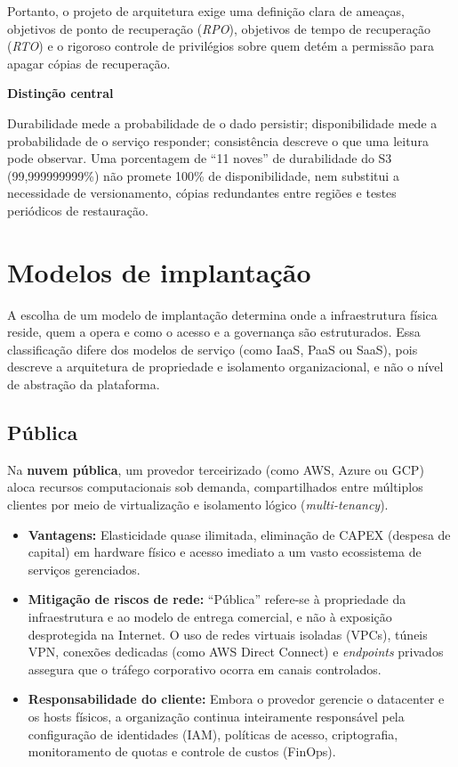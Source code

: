 \documentclass[11pt,a4paper]{article}
\newcommand{\destaque}[2]{\begin{center}\begin{minipage}{.96\textwidth}
  \colorbox{fundo}{\begin{minipage}{\dimexpr\linewidth-2\fboxsep}
  \textbf{\color{azul}#1}\par\small #2\end{minipage}}\end{minipage}\end{center}}
\begin{document}
Portanto, o projeto de arquitetura exige uma definição clara de ameaças, objetivos de ponto de recuperação (\emph{RPO}), objetivos de tempo de recuperação (\emph{RTO}) e o rigoroso controle de privilégios sobre quem detém a permissão para apagar cópias de recuperação.

\destaque{Distinção central}{Durabilidade mede a probabilidade de o dado persistir; disponibilidade
mede a probabilidade de o serviço responder; consistência descreve o que uma leitura pode observar.
Uma porcentagem de ``11 noves'' de durabilidade do S3 (99,999999999\%) não promete 100\% de disponibilidade,
nem substitui a necessidade de versionamento, cópias redundantes entre regiões e testes periódicos de restauração.}

\section{Modelos de implantação}

A escolha de um modelo de implantação determina onde a infraestrutura física reside, quem a opera e como o acesso e a governança são estruturados. Essa classificação difere dos modelos de serviço (como IaaS, PaaS ou SaaS), pois descreve a arquitetura de propriedade e isolamento organizacional, e não o nível de abstração da plataforma.

\subsection{Pública}

Na \textbf{nuvem pública}, um provedor terceirizado (como AWS, Azure ou GCP) aloca recursos computacionais sob demanda, compartilhados entre múltiplos clientes por meio de virtualização e isolamento lógico (\emph{multi-tenancy}). 

\begin{itemize}[leftmargin=*]
    \item \textbf{Vantagens:} Elasticidade quase ilimitada, eliminação de CAPEX (despesa de capital) em hardware físico e acesso imediato a um vasto ecossistema de serviços gerenciados.
    \item \textbf{Mitigação de riscos de rede:} ``Pública'' refere-se à propriedade da infraestrutura e ao modelo de entrega comercial, e não à exposição desprotegida na Internet. O uso de redes virtuais isoladas (VPCs), túneis VPN, conexões dedicadas (como AWS Direct Connect) e \emph{endpoints} privados assegura que o tráfego corporativo ocorra em canais controlados.
    \item \textbf{Responsabilidade do cliente:} Embora o provedor gerencie o datacenter e os hosts físicos, a organização continua inteiramente responsável pela configuração de identidades (IAM), políticas de acesso, criptografia, monitoramento de quotas e controle de custos (FinOps).
\end{itemize}
\end{document}
